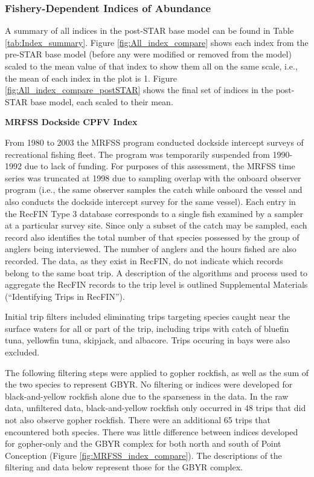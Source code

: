 \documentclass[12pt,]{article}
\begin{document}
\subsubsection{Fishery-Dependent Indices of
Abundance}\label{fishery-dependent-indices-of-abundance}

A summary of all indices in the post-STAR base model can be found in
Table \ref{tab:Index_summary}. Figure \ref{fig:All_index_compare} shows
each index from the pre-STAR base model (before any were modified or
removed from the model) scaled to the mean value of that index to show
them all on the same scale, i.e., the mean of each index in the plot is
1. Figure \ref{fig:All_index_compare_postSTAR} shows the final set of
indices in the post-STAR base model, each scaled to their mean.

\textbf{MRFSS Dockside CPFV Index}

From 1980 to 2003 the MRFSS program conducted dockside intercept surveys
of recreational fishing fleet. The program was temporarily suspended
from 1990-1992 due to lack of funding. For purposes of this assessment,
the MRFSS time series was truncated at 1998 due to sampling overlap with
the onboard observer program (i.e., the same observer samples the catch
while onboard the vessel and also conducts the dockside intercept survey
for the same vessel). Each entry in the RecFIN Type 3 database
corresponds to a single fish examined by a sampler at a particular
survey site. Since only a subset of the catch may be sampled, each
record also identifies the total number of that species possessed by the
group of anglers being interviewed. The number of anglers and the hours
fished are also recorded. The data, as they exist in RecFIN, do not
indicate which records belong to the same boat trip. A description of
the algorithms and process used to aggregate the RecFIN records to the
trip level is outlined Supplemental Materials (``Identifying Trips in
RecFIN'').

Initial trip filters included eliminating trips targeting species caught
near the surface waters for all or part of the trip, including trips
with catch of bluefin tuna, yellowfin tuna, skipjack, and albacore.
Trips occuring in bays were also excluded.

The following filtering steps were applied to gopher rockfish, as well
as the sum of the two species to represent GBYR. No filtering or indices
were developed for black-and-yellow rockfish alone due to the sparseness
in the data. In the raw data, unfiltered data, black-and-yellow rockfish
only occurred in 48 trips that did not also observe gopher rockfish.
There were an additional 65 trips that encountered both species. There
was little difference between indices developed for gopher-only and the
GBYR complex for both north and south of Point Conception (Figure
\ref{fig:MRFSS_index_compare}). The descriptions of the filtering and
data below represent those for the GBYR complex.
\end{document}
